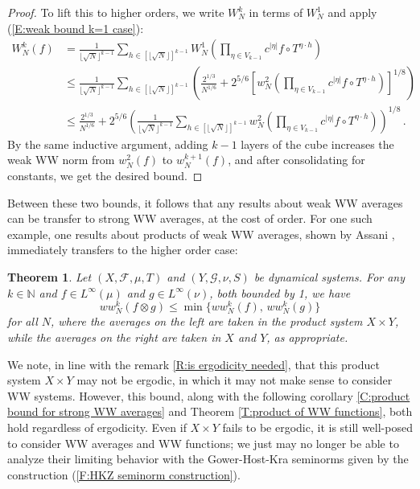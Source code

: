\documentclass[11pt, oneside]{amsart}   	%
\newcommand{\1}{\mathbbm{1}}
\newcommand{\N}{\mathbb{N}}
\newcommand{\floor}[1]{\lfloor#1\rfloor}
\newtheorem{theorem}{Theorem}[section]
\theoremstyle{definition}
\begin{document}
\begin{proof}
To lift this to higher orders, we write $W_N^k$ in terms of $W_N^1$ and apply (\ref{E:weak bound k=1 case}):
\begin{align*}
W_N^k(f) &=  \frac{1}{\floor{\sqrt{N}}^{k-1}}\sum_{h\in [\floor{\sqrt{N}}]^{k-1}} W^{1}_N \left( \prod_{\eta\in V_{k-1}} c^{|\eta|} f\circ T^{\eta \cdot h} \right) \\
&\leq \frac{1}{\floor{\sqrt{N}}^{k-1}}\sum_{h\in [\floor{\sqrt{N}}]^{k-1}} \left(\frac{2^{1/3}}{N^{1/6}} + 2^{5/6} \left[ w^{2}_N \left( \prod_{\eta\in V_{k-1}} c^{|\eta|} f\circ T^{\eta \cdot h} \right)\right]^{1/8} \right) \\
&\leq \frac{2^{1/3}}{N^{1/6}} + 2^{5/6} \left(\frac{1}{\floor{\sqrt{N}}^{k-1}}\sum_{h\in [\floor{\sqrt{N}}]^{k-1}} w^{2}_N \left( \prod_{\eta\in V_{k-1}} c^{|\eta|} f\circ T^{\eta \cdot h} \right) \right)^{1/8} \, .
\end{align*}
By the same inductive argument, adding $k-1$ layers of the cube increases the weak WW norm from $w^2_N(f)$ to $w^{k+1}_N(f)$, and after consolidating for constants, we get the desired bound.
\end{proof}

Between these two bounds, it follows that any results about weak WW averages can be transfer to strong WW averages, at the cost of order. For one such example, one results about products of weak WW averages, shown by Assani \cite{assani04}, immediately transfers to the higher order case:

\begin{theorem}\label{T:Product bound for weak WW averages}
Let $(X, \mathcal{F}, \mu, T)$ and $(Y, \mathcal{G}, \nu, S)$ be dynamical systems. For any $k\in \N$ and $f\in L^\infty(\mu)$ and $g\in L^\infty(\nu)$, both bounded by 1, we have
$$ww_N^k(f \otimes g) \leq \min \{ww_N^k (f), \, ww_N^{k} (g)\}$$
for all $N$, where the averages on the left are taken in the product system $X \times Y$, while the averages on the right are taken in $X$ and $Y$, as appropriate.
\end{theorem}
We note, in line with the remark \ref{R:is ergodicity needed}, that this product system $X \times Y$ may not be ergodic, in which it may not make sense to consider WW systems. However, this bound, along with the following corollary \ref{C:product bound for strong WW averages} and Theorem \ref{T:product of WW functions}, both hold regardless of ergodicity. Even if $X \times Y$ fails to be ergodic, it is still well-posed to consider WW averages and WW functions; we just may no longer be able to analyze their limiting behavior with the Gower-Host-Kra seminorms given by the construction (\ref{F:HKZ seminorm construction}).
\end{document}
